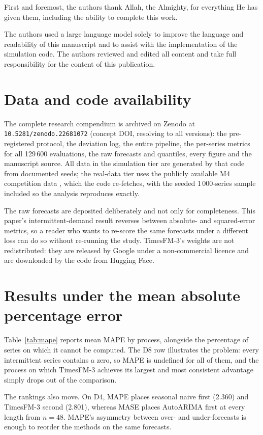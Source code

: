 \documentclass[11pt]{article}
\newcommand{\code}[1]{\texttt{#1}}
\providecommand{\tableref}[1]{Table~\ref{#1}}
\begin{document}
First and foremost, the authors thank Allah, the Almighty, for everything He has given them,
including the ability to complete this work.

The authors used a large language model solely to improve the language and readability of this
manuscript and to assist with the implementation of the simulation code. The authors reviewed and
edited all content and take full responsibility for the content of this publication.

\section*{Data and code availability}

The complete research compendium is archived on Zenodo at \code{10.5281/zenodo.22681072} (concept DOI, resolving to all versions): the pre-registered protocol, the deviation log, the entire pipeline, the per-series metrics for all 129\,600 evaluations, the raw forecasts and quantiles, every figure and the manuscript source. All data in the simulation tier are generated by that code from documented seeds; the real-data tier uses the publicly available M4 competition data \citep{makridakis2020m4}, which the code re-fetches, with the seeded 1\,000-series sample included so the analysis reproduces exactly.

The raw forecasts are deposited deliberately and not only for completeness. This paper's
intermittent-demand result reverses between absolute- and squared-error metrics, so a reader who
wants to re-score the same forecasts under a different loss can do so without re-running the
study. TimesFM-3's weights are not redistributed: they are released by Google under a
non-commercial licence and are downloaded by the code from Hugging Face.




\newpage
\appendix

\section{Results under the mean absolute percentage error}
\label{app:mape}

\tableref{tab:mape} reports mean MAPE by process, alongside the percentage of series on which
it cannot be computed. The D8 row illustrates the problem: every intermittent series contains a zero,
so MAPE is undefined for all of them, and the process on which TimesFM-3 achieves its largest
and most consistent advantage simply drops out of the comparison.

The rankings also move. On D4, MAPE places seasonal naive first (2.360) and TimesFM-3 second
(2.801), whereas MASE places AutoARIMA first at every length from $n = 48$. MAPE's asymmetry
between over- and under-forecasts is enough to reorder the methods on the same forecasts.


\end{document}
